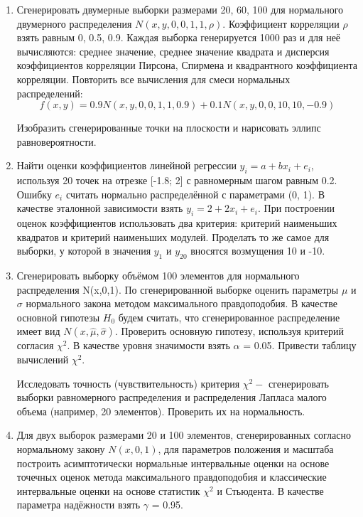 \documentclass[12pt]{article}
\begin{document}
	\begin{enumerate}
		\item Сгенерировать двумерные выборки размерами 20, 60, 100 для нормального двумерного распределения $N(x,y,0,0,1,1,\rho)$. Коэффициент корреляции $\rho$ взять равным 0, 0.5, 0.9. Каждая выборка генерируется 1000 раз и для неё вычисляются: среднее значение, среднее значение квадрата и дисперсия коэффициентов корреляции Пирсона, Спирмена и квадрантного коэффициента корреляции. Повторить все вычисления для смеси нормальных распределений:
		\begin{equation}
			f(x,y) = 0.9N(x,y,0,0,1,1,0.9) + 0.1N(x,y,0,0,10,10,-0.9)
		\end{equation}
		
		Изобразить сгенерированные точки на плоскости и нарисовать эллипс равновероятности.
		\item Найти оценки коэффициентов линейной регрессии $y_{i} = a + bx_{i} + e_{i}$, используя 20 точек на отрезке [-1.8; 2] с равномерным шагом равным 0.2. Ошибку $e_{i}$ считать нормально распределённой с параметрами (0, 1). В качестве эталонной зависимости взять $y_{i} = 2 + 2x_{i} + e_{i}$. При построении оценок коэффициентов использовать два критерия: критерий наименьших квадратов и критерий наименьших модулей. Проделать то же самое для выборки, у которой в значения $y_{1}$ и $y_{20}$ вносятся возмущения 10 и -10. 
		\item Сгенерировать выборку объёмом 100 элементов для нормального распределения N(x,0,1). По сгенерированной выборке оценить параметры $\mu$ и $\sigma$ нормального закона методом максимального правдоподобия. В качестве основной гипотезы $H_{0}$ будем считать, что сгенерированное распределение имеет вид $N(x,\hat{\mu}, \hat{\sigma})$. Проверить основную гипотезу, используя критерий согласия $\chi^{2}$. В качестве уровня значимости взять $\alpha$ = 0.05. Привести таблицу вычислений $\chi^{2}$. 
		
		Исследовать точность (чувствительность) критерия $\chi^{2} - $ сгенерировать выборки равномерного распределения и распределения Лапласа малого объема (например, 20 элементов). Проверить их на нормальность.
		\item Для двух выборок размерами 20 и 100 элементов, сгенерированных согласно нормальному закону $N(x,0,1)$, для параметров положения и масштаба построить асимптотически нормальные интервальные оценки на основе точечных оценок метода максимального правдоподобия и классические интервальные оценки на основе статистик $\chi^{2}$ и Стьюдента. В качестве параметра надёжности взять $\gamma$ = 0.95.
		
	\end{enumerate}
	
\end{document}
